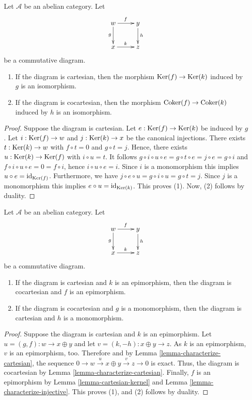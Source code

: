 \begin{lemma}
\label{lemma-cartesian-kernel}
Let $\mathcal{A}$ be an abelian category. Let
$$
\xymatrix{
w\ar[r]^f\ar[d]_g
& y\ar[d]^h\\
x\ar[r]^k
& z
}
$$
be a commutative diagram.
\begin{enumerate}
\item If the diagram is cartesian, then the morphism 
$\mathop{\mathrm{Ker}}(f)\to\mathop{\mathrm{Ker}}(k)$ induced by $g$ is an isomorphism.
\item If the diagram is cocartesian, then the morphism 
$\mathop{\mathrm{Coker}}(f)\to\mathop{\mathrm{Coker}}(k)$ induced by $h$ is an isomorphism.
\end{enumerate}
\end{lemma}

\begin{proof}
Suppose the diagram is cartesian. Let 
$e:\mathop{\mathrm{Ker}}(f)\to\mathop{\mathrm{Ker}}(k)$ be induced by $g$. Let 
$i:\mathop{\mathrm{Ker}}(f)\to w$ and $j:\mathop{\mathrm{Ker}}(k)\to x$ be the canonical 
injections. There exists $t:\mathop{\mathrm{Ker}}(k)\to w$ with $f\circ t=0$ 
and $g\circ t=j$. Hence, there exists $u:\mathop{\mathrm{Ker}}(k)\to\mathop{\mathrm{Ker}}(f)$ 
with $i\circ u=t$. It follows 
$g\circ i\circ u\circ e=g\circ t\circ e=j\circ e=g\circ i$ and 
$f\circ i\circ u\circ e=0=f\circ i$, hence $i\circ u\circ e=i$. Since 
$i$ is a monomorphism this implies $u\circ e=\text{id}_{\mathop{\mathrm{Ker}}(f)}$.
Furthermore, we have $j\circ e\circ u=g\circ i\circ u=g\circ t=j$. 
Since $j$ is a monomorphism this implies $e\circ u=\text{id}_{\mathop{\mathrm{Ker}}(k)}$.
This proves (1). Now, (2) follows by duality.
\end{proof}

\begin{lemma}
\label{lemma-cartesian-cocartesian}
Let $\mathcal{A}$ be an abelian category. Let
$$
\xymatrix{
w\ar[r]^f\ar[d]_g
& y\ar[d]^h\\
x\ar[r]^k
& z
}
$$
be a commutative diagram.
\begin{enumerate}
\item If the diagram is cartesian and $k$ is an epimorphism, 
then the diagram is cocartesian and $f$ is an epimorphism.
\item If the diagram is cocartesian and $g$ is a monomorphism, 
then the diagram is cartesian and $h$ is a monomorphism.
\end{enumerate}
\end{lemma}

\begin{proof}
Suppose the diagram is cartesian and $k$ is an epimorphism. 
Let $u = (g, f) : w \to x \oplus y$ and let $v = (k, -h) : x \oplus y \to z$. 
As $k$ is an epimorphism, $v$ is an epimorphism, too. Therefore 
and by Lemma \ref{lemma-characterize-cartesian}, the sequence 
$0\to w\overset{u}\to x\oplus y\overset{v}\to z\to 0$ is exact. Thus, the 
diagram is cocartesian by Lemma \ref{lemma-characterize-cartesian}. Finally, 
$f$ is an epimorphism by Lemma \ref{lemma-cartesian-kernel} and 
Lemma \ref{lemma-characterize-injective}. This proves (1), and (2) 
follows by duality.
\end{proof}

